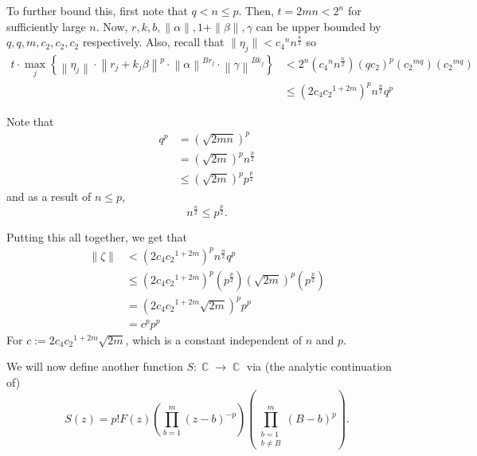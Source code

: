 \documentclass[a4paper, 11pt]{book}
\DeclareMathOperator{\C}{\mathbb{C}}
\begin{document}
To further bound this, first note that $q < n \leq p$. Then, $t = 2mn < 2^{n}$ for sufficiently large $n$. Now, $r, k, b, \| \alpha \|, 1 + \| \beta \|, \gamma$ can be upper bounded by $q,q,m,c_2, c_2, c_2$ respectively. Also, recall that $\| \eta_j \| < {c_4}^{n}n^{\frac{n}{2}}$ so
\begin{align*}
    t \cdot \max_{j} \left\{ \left\| \eta_{j} \right\| \cdot {\left\| r_j + k_j \beta \right\|}^{p} \cdot  {\left\| \alpha \right\|}^{Br_{j}}  \cdot  {\left\| \gamma \right\|}^{Bk_{j}} \right\} &< 2^{n}\left({c_4}^{n}n^{\frac{n}{2}}\right){\left(qc_2\right)}^{p}\left({{c_{2}}}^{mq}\right)\left({{c_{2}}}^{mq}\right) \\
                                                                                                                                                                                                  &\leq {\left(2c_{4}{c_{2}}^{1+2m}\right)}^{p}{n}^{\frac{n}{2}}{q}^{p}
\end{align*}

Note that
\begin{align*}
    q^p &= {\left(\sqrt{2mn}\right)}^{p} \\ 
        &= {\left(\sqrt{2m}\right)}^{p}{n}^{\frac{p}{2}} \\
        &\leq {\left(\sqrt{2m}\right)}^{p}{p}^{\frac{p}{2}}
\end{align*}
and as a result of $n \leq p$, \[n^{\frac{n}{2}} \leq p^{\frac{p}{2}}.\]

Putting this all together, we get that
\begin{align*}
    \| \zeta \| &< {\left(2c_{4}{c_{2}}^{1+2m}\right)}^{p}{n}^{\frac{n}{2}}{q}^{p} \\
                &\leq {\left(2c_{4}{c_{2}}^{1+2m}\right)}^{p}\left({p}^{\frac{p}{2}}\right){\left(\sqrt{2m}\right)}^{p}\left({p}^{\frac{p}{2}}\right) \\
                &= {\left(2c_{4}{c_{2}}^{1+2m}\sqrt{2m}\right)}^{p}{p}^{p} \\
                &= {c}^{p}{p}^{p}
\end{align*}
For $c := 2c_{4}{c_{2}}^{1+2m}\sqrt{2m}$, which is a constant independent of $n$ and $p$.\par

We will now define another function $S : \C \to \C$ via (the analytic continuation of)
\[S(z) = p! F(z) \left(\prod\limits_{b=1}^{m} {(z - b)}^{-p}\right)\left(\prod\limits_{\substack {b = 1 \\ b \neq B}}^{m} {(B - b)}^{p}\right).\]
\end{document}
